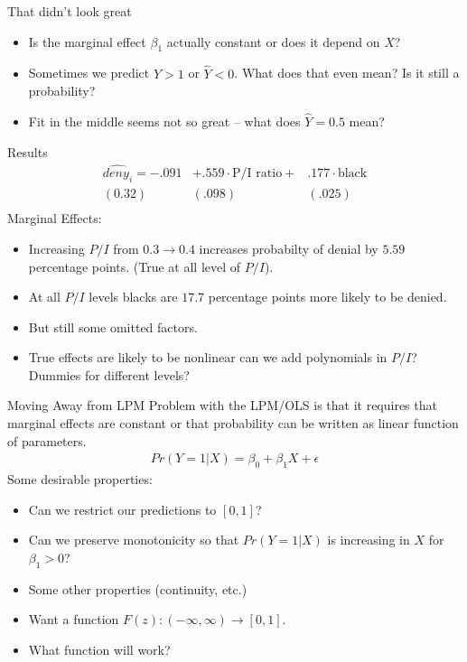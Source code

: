 \documentclass[aspectratio=169]{beamer}
\begin{document}
\begin{frame}{That didn't look great}
\begin{itemize}
\item Is the marginal effect $\beta_1$ actually constant or does it depend on $X$?
\item Sometimes we predict $\hat{Y} >1$ or $\hat{Y} <0$. What does that even mean? Is it still a probability?
\item Fit in the middle seems not so great -- what does $\hat{Y} = 0.5$ mean?
\end{itemize}
\end{frame}

\begin{frame}{Results}
\begin{eqnarray*}
\widehat{deny_i}= -.091& + .559 \cdot \text{P/I ratio} + &.177 \cdot \text{black} \\
(0.32)&( .098) & (.025)\\
\end{eqnarray*}
Marginal Effects: 
\begin{itemize}
\item Increasing $P/I$ from $0.3 \rightarrow 0.4$ increases probabilty of denial by $5.59$ percentage points. (True at all level of $P/I$).
\item At all $P/I$ levels blacks are $17.7$ percentage points more likely to be denied.
\item But still some omitted factors.
\item True effects are likely to be \alert{nonlinear} can we add polynomials in $P/I$? Dummies for different levels? 
\end{itemize}
\end{frame}


\begin{frame}{Moving Away from LPM}
Problem with the LPM/OLS is that it requires that \alert{marginal effects are constant} or that probability can be written as linear function of parameters.
\begin{eqnarray*}
Pr(Y=1 | X) = \beta_0 + \beta_1 X+ \epsilon
\end{eqnarray*}
Some desirable properties:
\begin{itemize}
\item Can we restrict our predictions to $[0,1]$?
\item Can we preserve \alert{monotonicity} so that $Pr(Y=1| X)$ is increasing in $X$ for $\beta_1 >0$?
\item Some other properties (continuity, etc.) \pause
\item Want a function $F(z): (-\infty,\infty) \rightarrow [0,1]$.
\item What function will work?
\end{itemize}
\end{frame}
\end{document}
